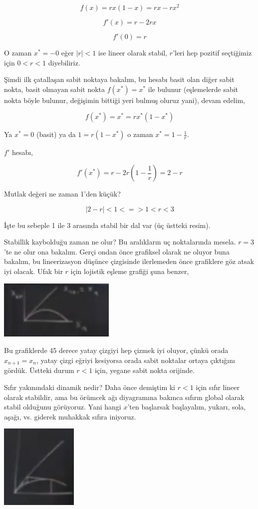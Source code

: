 \documentclass[12pt,fleqn]{article}\usepackage{../../common}
\begin{document}
$$ f(x) =  r x (1-x) = rx - rx^2$$

$$ f'(x) = r - 2rx$$

$$ f'(0) = r$$

O zaman $x^\ast=-0$ eğer $|r|<1$ ise lineer olarak stabil, $r$'leri hep
pozitif seçtiğimiz için $0 < r <1$ diyebiliriz.

Şimdi ilk çatallaşan sabit noktaya bakalım, bu hesabı basit olan diğer
sabit nokta, basit olmayan sabit nokta $f(x^\ast) = x^\ast$ ile bulunur
(eşlemelerde sabit nokta böyle bulunur, değişimin bittiği yeri bulmuş
oluruz yani), devam edelim,

$$ f(x^\ast) = x^\ast = rx^\ast(1-x^\ast)$$

Ya $x^\ast=0$ (basit) ya da $1=r(1-x^\ast)$ o zaman $x^\ast = 1-\frac{1}{r}$. 

$f'$ hesabı, 

$$ f'(x^\ast) = r-2r \left(1-\frac{1}{r} \right) = 2-r$$

Mutlak değeri ne zaman 1'den küçük?

$$  | 2-r | < 1 <=> 1 < r < 3 $$

İşte bu sebeple 1 ile 3 arasında stabil bir dal var (üç üstteki resim). 

Stabillik kaybolduğu zaman ne olur? Bu aralıkların uç noktalarında
mesela. $r=3$'te ne olur ona bakalım. Gerçi ondan önce grafiksel olarak ne
oluyor buna bakalım, bu lineerizasyon düşünce çizgisinde ilerlemeden önce
grafiklere göz atsak iyi olacak. Ufak bir $r$ için lojistik eşleme grafiği
şuna benzer,

\includegraphics[width=15em]{19_10.png}
 
Bu grafiklerde 45 derece yatay çizgiyi hep çizmek iyi oluyor, çünkü orada
$x_{n+1} = x_n$, yatay çizgi eğriyi kesiyorsa orada sabit noktalar ortaya
çıktığını gördük. Üstteki durum $r<1$ için, yegane sabit nokta orijinde.

Sıfır yakınındaki dinamik nedir? Daha önce demiştim ki $r<1$ için sıfır
lineer olarak stabildir, ama bu örümcek ağı diyagramına bakınca sıfırın
global olarak stabil olduğunu görüyoruz. Yani hangi $x$'ten başlarsak
başlayalım, yukarı, sola, aşağı, vs. giderek muhakkak sıfıra iniyoruz.

\includegraphics[width=10em]{19_11.png}
 
\end{document}
